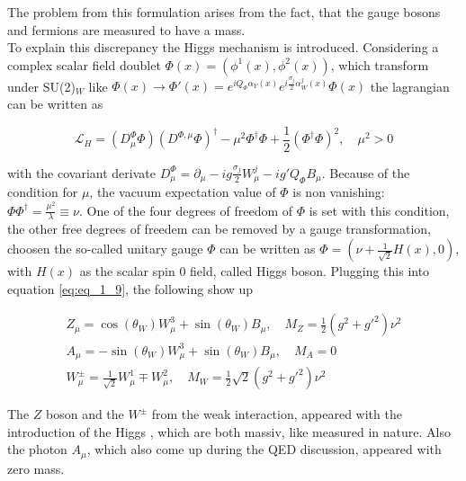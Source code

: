 The problem from this formulation arises from the fact, that the gauge bosons and fermions are measured to have a mass. \\

To explain this discrepancy the Higgs mechanism \cite{HIGGS} is introduced. Considering a complex scalar field doublet $\Phi(x) = (\phi^{1}(x), \phi^{2}(x))$, which transform under SU(2)$_{W}$ like $\Phi(x) \rightarrow \Phi'(x) = e^{iQ_{\Phi} \alpha_{Y}(x)} e^{i\frac{\sigma_{j}}{2}\alpha^{j}_{W}(x)}\Phi(x)$ the lagrangian can be written as

\begin{equation}
	\label{eq:eq_1_9}
	\mathcal{L}_{H} = (D^{\Phi}_{\mu}\Phi)(D^{\Phi, \mu}\Phi)^{\dagger} - \mu^2\Phi^{\dagger}\Phi + \frac{1}{2}(\Phi^{\dagger}\Phi)^2, \quad \mu^2 > 0
\end{equation}

with the covariant derivate $D^{\Phi}_{\mu} = \partial_{\mu}  - ig\frac{\sigma_{j}}{2}W^{j}_{\mu} - ig'Q_{\Phi}B_{\mu}$. Because of the condition for $\mu$, the vacuum expectation value of $\Phi$ is non vanishing: $\Phi\Phi^{\dagger} = \frac{\mu^2}{\lambda} \equiv \nu$. One of the four degrees of freedom of $\Phi$ is set with this condition, the other free degrees of freedem can be removed by a gauge transformation, choosen the so-called unitary gauge $\Phi$ can be written as $\Phi = (\nu + \frac{1}{\sqrt{2}}H(x), 0)$, with $H(x)$ as the scalar spin 0 field, called Higgs boson. Plugging this into equation \ref{eq:eq_1_9}, the following show up

\begin{equation}
	\label{eq:eq_1_10}
	\begin{split}
		Z_{\mu} = \cos(\theta_{W})W^{3}_{\mu} + \sin(\theta_{W})B_{\mu}, \quad M_{Z} = \frac{1}{2}(g^2 + g'^2)\nu^2 \\
		A_{\mu} = -\sin(\theta_{W})W^{3}_{\mu} + \sin(\theta_{W})B_{\mu}, \quad M_{A} = 0 \\
		W^{\pm}_{\mu} = \frac{1}{\sqrt{2}}W^{1}_{\mu} \mp W^{2}_{\mu}, \quad M_{W} = \frac{1}2{\sqrt{2}}(g^2+g'^2)\nu^2
	\end{split}
\end{equation}

The $Z$ boson and the $W^{\pm}$ from the weak interaction, appeared with the introduction of the Higgs \cite{HIGGDISCOVER}, which are both massiv, like measured in nature. Also the photon $A_{\mu}$, which also come up during the \acs{QED} discussion, appeared with zero mass. 



